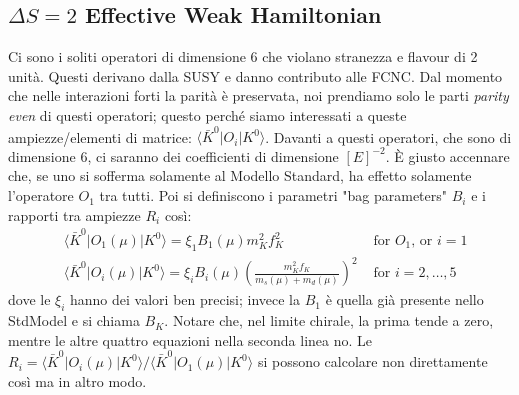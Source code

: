 \documentclass[12pt,a4paper,openright]{article}
\newcommand{\la}{\langle}
\newcommand{\ra}{\rangle}
\newcommand{\colg}{\textcolor{PineGreen}}
\begin{document}
\subsection{$\Delta S = 2$ Effective Weak Hamiltonian}
Ci sono i soliti operatori di dimensione 6 che violano stranezza e flavour di 2 unità.
Questi derivano dalla \colg{SUSY} e danno contributo alle \colg{FCNC}.
Dal momento che nelle interazioni forti la parità è preservata, noi prendiamo solo le parti \textit{parity even} di questi operatori;
questo perché siamo interessati a queste ampiezze/elementi di matrice: $\la \bar K^0 | O_i | K^0 \ra$.
Davanti a questi operatori, che sono di dimensione 6, ci saranno dei coefficienti di dimensione $[E]^{-2}$.
È giusto accennare che, se uno si sofferma solamente al Modello Standard, ha effetto solamente l'operatore $O_1$ tra tutti.
\newline
Poi si definiscono i parametri "bag parameters" $B_i$ e i rapporti tra ampiezze $R_i$ così:
\begin{equation*}
  \begin{aligned}
    & \la \bar K^0 | O_1(\mu) | K^0 \ra = \xi_1 B_1 (\mu) m_K^2 f_K^2 & \text{ for $O_1$, or $i=1$}
    \\
    & \la \bar K^0 | O_i(\mu) | K^0 \ra = \xi_i B_i (\mu) \left( \frac{m_K^2 f_K}{m_s(\mu) + m_d(\mu)} \right)^2 & \text{ for $i = 2, \dots, 5$}
  \end{aligned}
\end{equation*}
dove le $\xi_i$ hanno dei valori ben precisi; invece la $B_1$ è quella già presente nello StdModel e si chiama $B_K$.
Notare che, nel limite chirale, la prima tende a zero, mentre le altre quattro equazioni nella seconda linea no.
Le $R_i = \la \bar K^0 | O_i(\mu) | K^0 \ra / \la \bar K^0 | O_1(\mu) | K^0 \ra$ si possono calcolare non direttamente così ma in altro modo.
\end{document}
